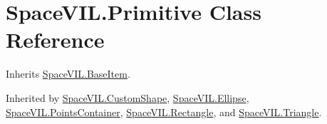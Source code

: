 \hypertarget{class_space_v_i_l_1_1_primitive}{}\section{Space\+V\+I\+L.\+Primitive Class Reference}
\label{class_space_v_i_l_1_1_primitive}


Inherits \mbox{\hyperlink{class_space_v_i_l_1_1_base_item}{Space\+V\+I\+L.\+Base\+Item}}.



Inherited by \mbox{\hyperlink{class_space_v_i_l_1_1_custom_shape}{Space\+V\+I\+L.\+Custom\+Shape}}, \mbox{\hyperlink{class_space_v_i_l_1_1_ellipse}{Space\+V\+I\+L.\+Ellipse}}, \mbox{\hyperlink{class_space_v_i_l_1_1_points_container}{Space\+V\+I\+L.\+Points\+Container}}, \mbox{\hyperlink{class_space_v_i_l_1_1_rectangle}{Space\+V\+I\+L.\+Rectangle}}, and \mbox{\hyperlink{class_space_v_i_l_1_1_triangle}{Space\+V\+I\+L.\+Triangle}}.

